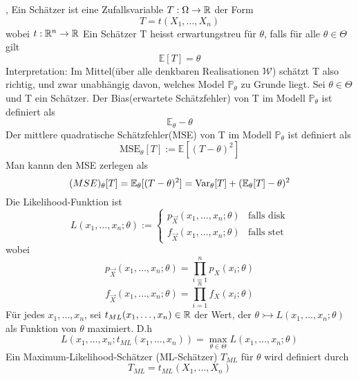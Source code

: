 \sep
\Def[1.1] \newline
Ein Schätzer ist eine Zufallsvariable \(T : \Omega \rightarrow \mathbb{R} \) der Form \[ T = t(X_1, \dots , X_n)\] wobei \(t : \mathbb{R}^n \rightarrow \mathbb{R}\)
\Def[1.2] \newline
Ein Schätzer T heisst erwartungstreu für \( \theta \), falls für alle \( \theta \in \Theta\) gilt \[ \mathbb{E}[T] = \theta\]
\Bem[1.2A] \newline
Interpretation: Im Mittel(über alle denkbaren Realisationen \(\mathcal{W}\)) schätzt T also richtig, und zwar unabhängig davon, welches Model \(\mathbb{P}_\theta \) zu Grunde liegt.
\Def[1.3] Sei \(\theta \in \Theta \) und T ein Schätzer. Der Bias(erwartete Schätzfehler) von T im Modell \( \mathbb{P}_\theta\) ist definiert als \[ \mathbb{E}_\theta - \theta\]
Der mittlere quadratische Schätzfehler(MSE) von T im Modell \( \mathbb{P}_\theta\) ist definiert als \[\text{MSE}_\theta[T] := \mathbb{E}[(T - \theta)^2]\]
\Bem[1.3A] \newline
Man kannn den MSE zerlegen als \[ \text(MSE)_\theta[T] = \mathbb{E}_\theta[(T - \theta)^2] = \text{Var}_\theta[T] + (\mathbb{E}_\theta[T] - \theta)^2\]
\Def[1.4] \newline
Die Likelihood-Funktion ist \[L(x_1, \dots , x_n; \theta) := \left.
    \begin{cases}
    p_{\overrightarrow{X}}(x_1, \dots , x_n; \theta) & \text{falls disk} \\
    f_{\overrightarrow{X}}(x_1, \dots , x_n; \theta) & \text{falls stet}
\end{cases}
\right.\]
wobei 
\[p_{\overrightarrow{X}}(x_1, \dots , x_n; \theta) = \prod_{i=1}^n p_X(x_i;\theta)\]
\[f_{\overrightarrow{X}}(x_1, \dots , x_n; \theta) = \prod_{i=1}^n f_X(x_i;\theta)\]
\Def[1.5] \newline
Für jedes \(x_1, \dots , x_n\), sei \(t_{ML}(x_1, \dots, x_n) \in \mathbb{R}\) der Wert, der \(\theta \rightarrowtail L(x_1, \dots , x_n; \theta )\) als Funktion von \( \theta \) maximiert. D.h
\[L(x_1, \dots , x_n; t_{ML}(x_1, \dots , x_n)) = \max_{\theta \in \Theta} L(x_1, \dots , x_n; \theta)\]
Ein Maximum-Likelihood-Schätzer (ML-Schätzer) \(T_{ML}\) für \( \theta \) wird definiert durch \[ T_{ML} = t_{ML}(X_1, \dots , X_n)\]
